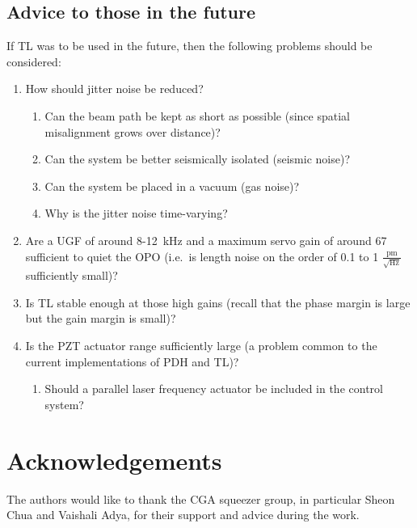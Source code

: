 \documentclass[aps,pra,superscriptaddress,reprint,nofootinbib]{revtex4-1}
\begin{document}
\subsection{Advice to those in the future}
\label{sec:future_work}

If TL was to be used in the future, then the following problems should be considered: 
\begin{enumerate}
\item How should jitter noise be reduced?
	\begin{enumerate}
	\item Can the beam path be kept as short as possible (since spatial misalignment grows over distance)?
	\item Can the system be better seismically isolated (seismic noise)?
	\item Can the system be placed in a vacuum (gas noise)?
	\item Why is the jitter noise time-varying?
	\end{enumerate}
\item Are a UGF of around 8-12~kHz and a maximum servo gain of around 67 sufficient to quiet the OPO (i.e.\ is length noise on the order of 0.1 to 1 $\frac{\mathrm{pm}}{\sqrt{\mathrm{Hz}}}$ sufficiently small)?
\item Is TL stable enough at those high gains (recall that the phase margin is large but the gain margin is small)?
\item Is the PZT actuator range sufficiently large (a problem common to the current implementations of PDH and TL)?
	\begin{enumerate}
	\item Should a parallel laser frequency actuator be included in the control system?
	\end{enumerate}
\end{enumerate}

\section{Acknowledgements}

The authors would like to thank the CGA squeezer group, in particular Sheon Chua and Vaishali Adya, for their support and advice during the work.


\nocite{*}


\end{document}
